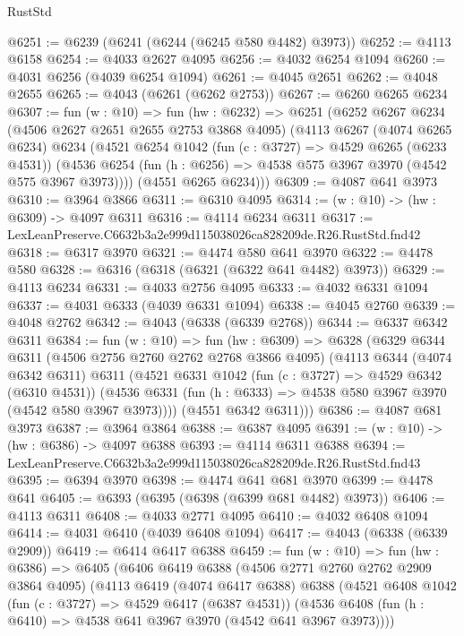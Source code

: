 \begin{lexlean}{RustStd}
\begin{coremodule}
@6251 := @6239 (@6241 (@6244 (@6245 @580 @4482) @3973))
@6252 := @4113 @6158
@6254 := @4033 @2627 @4095
@6256 := @4032 @6254 @1094
@6260 := @4031 @6256 (@4039 @6254 @1094)
@6261 := @4045 @2651
@6262 := @4048 @2655
@6265 := @4043 (@6261 (@6262 @2753))
@6267 := @6260 @6265 @6234
@6307 := fun (w : @10) =>
  fun (hw : @6232) =>
  @6251
    (@6252
      @6267
      @6234
      (@4506 @2627 @2651 @2655 @2753 @3868 @4095)
      (@4113
        @6267
        (@4074 @6265 @6234)
        @6234
        (@4521
          @6254
          @1042
          (fun (c : @3727) => @4529 @6265 (@6233 @4531))
          (@4536 @6254 (fun (h : @6256) => @4538 @575 @3967 @3970 (@4542 @575 @3967 @3973))))
        (@4551 @6265 @6234)))
@6309 := @4087 @641 @3973
@6310 := @3964 @3866
@6311 := @6310 @4095
@6314 := (w : @10) -> (hw : @6309) -> @4097 @6311
@6316 := @4114 @6234 @6311
@6317 := LexLeanPreserve.C6632b3a2e999d115038026ca828209de.R26.RustStd.fnd42
@6318 := @6317 @3970
@6321 := @4474 @580 @641 @3970
@6322 := @4478 @580
@6328 := @6316 (@6318 (@6321 (@6322 @641 @4482) @3973))
@6329 := @4113 @6234
@6331 := @4033 @2756 @4095
@6333 := @4032 @6331 @1094
@6337 := @4031 @6333 (@4039 @6331 @1094)
@6338 := @4045 @2760
@6339 := @4048 @2762
@6342 := @4043 (@6338 (@6339 @2768))
@6344 := @6337 @6342 @6311
@6384 := fun (w : @10) =>
  fun (hw : @6309) =>
  @6328
    (@6329
      @6344
      @6311
      (@4506 @2756 @2760 @2762 @2768 @3866 @4095)
      (@4113
        @6344
        (@4074 @6342 @6311)
        @6311
        (@4521
          @6331
          @1042
          (fun (c : @3727) => @4529 @6342 (@6310 @4531))
          (@4536 @6331 (fun (h : @6333) => @4538 @580 @3967 @3970 (@4542 @580 @3967 @3973))))
        (@4551 @6342 @6311)))
@6386 := @4087 @681 @3973
@6387 := @3964 @3864
@6388 := @6387 @4095
@6391 := (w : @10) -> (hw : @6386) -> @4097 @6388
@6393 := @4114 @6311 @6388
@6394 := LexLeanPreserve.C6632b3a2e999d115038026ca828209de.R26.RustStd.fnd43
@6395 := @6394 @3970
@6398 := @4474 @641 @681 @3970
@6399 := @4478 @641
@6405 := @6393 (@6395 (@6398 (@6399 @681 @4482) @3973))
@6406 := @4113 @6311
@6408 := @4033 @2771 @4095
@6410 := @4032 @6408 @1094
@6414 := @4031 @6410 (@4039 @6408 @1094)
@6417 := @4043 (@6338 (@6339 @2909))
@6419 := @6414 @6417 @6388
@6459 := fun (w : @10) =>
  fun (hw : @6386) =>
  @6405
    (@6406
      @6419
      @6388
      (@4506 @2771 @2760 @2762 @2909 @3864 @4095)
      (@4113
        @6419
        (@4074 @6417 @6388)
        @6388
        (@4521
          @6408
          @1042
          (fun (c : @3727) => @4529 @6417 (@6387 @4531))
          (@4536 @6408 (fun (h : @6410) => @4538 @641 @3967 @3970 (@4542 @641 @3967 @3973))))

\end{coremodule}
\end{lexlean}
